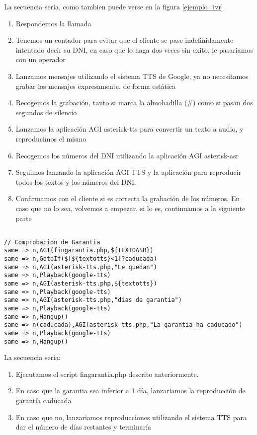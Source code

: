 La secuencia sería, como tambien puede verse en la figura \ref{ejemplo_ivr}

\begin{enumerate}
	\item Respondemos la llamada
	\item Tenemos un contador para evitar que el cliente se pase indefinidamente intentado decir su DNI, en caso que lo haga dos veces sin exito, le pasariamos con un operador
	\item Lanzamos mensajes utilizando el sistema TTS de Google, ya no necesitamos grabar los mensajes expresamente, de forma estática
	\item Recogemos la grabación, tanto si marca la almohadilla (\#) como si pasan dos segundos de silencio
	\item Lanzamos la aplicación AGI asterisk-tts para convertir un texto a audio, y reproducimos el mismo
	\item Recogemos los números del DNI utilizando la aplicación AGI asterisk-asr
	\item Seguimos lanzando la aplicación AGI TTS y la aplicación para reproducir todos los textos y los números del DNI.
	\item Confirmamos con el cliente si es correcta la grabación de los números. En caso que no lo sea, volvemos a empezar, si lo es, continuamos a la siguiente parte
\end{enumerate}


\begin{lstlisting}[style=bash,title={(/etc/asterisk/extensions.conf}]

// Comprobacion de Garantia
same => n,AGI(fingarantia.php,${TEXTOASR})
same => n,GotoIf($[${textotts}<1]?caducada)
same => n,AGI(asterisk-tts.php,"Le quedan")
same => n,Playback(google-tts)
same => n,AGI(asterisk-tts.php,${textotts})
same => n,Playback(google-tts)
same => n,AGI(asterisk-tts.php,"dias de garantia")
same => n,Playback(google-tts)
same => n,Hangup()
same => n(caducada),AGI(asterisk-tts.php,"La garantia ha caducado")
same => n,Playback(google-tts)
same => n,Hangup()

\end{lstlisting}

La secuencia seria:

\begin{enumerate}
	\item Ejecutamos el script fingarantia.php descrito anteriormente.
	\item En caso que la garantia sea inferior a 1 día, lanzariamos la reproducción de garantía caducada
	\item En caso que no, lanzariamos reproducciones utilizando el sistema TTS para dar el número de días restantes y terminaría
\end{enumerate}


